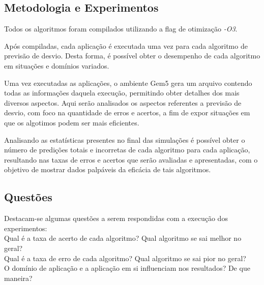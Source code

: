 \documentclass[12pt]{article}
\begin{document}



\subsection{Metodologia e Experimentos}

Todos os algoritmos foram compilados utilizando a flag de otimização \textit{-O3}. 

Após compiladas, cada aplicação é executada uma vez para cada algoritmo de previsão de desvio. Desta forma, é possível obter
o desempenho de cada algoritmo em situações e domínios variados.

Uma vez executadas as aplicações, o ambiente Gem5 gera um arquivo contendo todas as informações daquela execução, 
permitindo obter detalhes dos mais diversos aspectos. Aqui serão analisados os aspectos referentes a previsão de
desvio, com foco na quantidade de erros e acertos, a fim de expor situações em que os algotimos podem ser mais eficientes.

Analisando as estatísticas presentes no final das simulações é possível obter o número de predições totais e incorretas de cada 
algoritmo para cada aplicação, resultando nas taxas de erros e acertos que serão avaliadas e apresentadas, com o objetivo de mostrar
dados palpáveis da eficácia de tais algoritmos.

\subsection{Questões}
Destacam-se algumas questões a serem respondidas com a execução dos experimentos:\\
Qual é a taxa de acerto de cada algoritmo? Qual algoritmo se sai melhor no geral?\\
Qual é a taxa de erro de cada algoritmo? Qual algoritmo se sai pior no geral?\\
O domínio de aplicação e a aplicação em si influenciam nos resultados? De que maneira?
\end{document}
